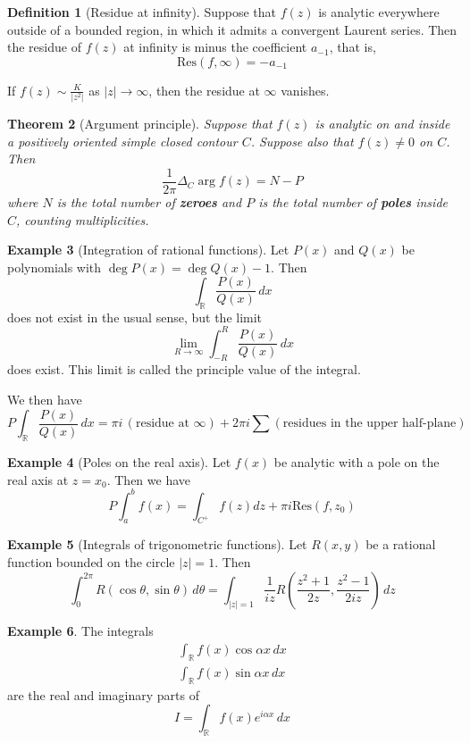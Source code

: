 \documentclass[10pt, oneside, reqno]{amsart}
\theoremstyle{plain}%
\newtheorem{thm}{Theorem}[section]
\theoremstyle{definition}
\newtheorem{defn}[thm]{Definition}
\newtheorem{exmp}[thm]{Example}
\theoremstyle{remark}
\newcommand{\res}[2]{\text{Res}(#1,#2)}
\newcommand{\R}{\mathbb{R}}
\begin{document}
\begin{defn}[Residue at infinity]
    Suppose that $f(z)$ is analytic everywhere outside of a bounded region, in which it admits a convergent Laurent series.  Then the residue of $f(z)$ at infinity is minus the coefficient $a_{-1}$, that is,\[
        \res{f}{\infty} = -a_{-1}
    \]
    
    If $f(z) \sim \frac{K}{|z^2|}$ as $|z| \rightarrow \infty$, then the residue at $\infty$ vanishes.
\end{defn}



\begin{thm}[Argument principle]
    Suppose that $f(z)$ is analytic on and inside a positively oriented simple closed contour $C$.  Suppose also that $f(z) \neq 0$ on $C$.  Then \[
        \frac{1}{2\pi} \Delta_C \arg f(z) = N - P
    \] where $N$ is the total number of \textbf{zeroes} and $P$ is the total number of \textbf{poles} inside $C$, counting multiplicities.
\end{thm}

\begin{exmp}[Integration of rational functions]
    Let $P(x)$ and $Q(x)$ be polynomials with $\deg P(x) = \deg Q(x) - 1$.  Then \[
        \int_\R \frac{P(x)}{Q(x)} \, dx 
    \] does not exist in the usual sense, but the limit \[
        \lim_{R \rightarrow \infty} \int_{-R}^R \frac{P(x)}{Q(x)} \, dx
    \] does exist.  This limit is called the principle value of the integral.

    We then have 
\[
    P \int_{\R} \frac{P(x)}{Q(x)} \, dx = \pi i \,(\text{residue at $\infty$}) + 2 \pi i \sum (\text{residues in the upper half-plane})
\]
\end{exmp}

\begin{exmp}[Poles on the real axis]
    Let $f(x)$ be analytic with a pole on the real axis at $z = x_0$.  Then we have \[
        P \int_a^b f(x) = \int_{C^+} f(z) dz + \pi i \res{f}{z_0}
    \]
\end{exmp}


\begin{exmp}[Integrals of trigonometric functions]
    Let $R(x,y)$ be a rational function bounded on the circle $|z| = 1$.  Then \[
        \int_0^{2 \pi} R(\cos \theta, \sin \theta) \, d \theta = \int_{|z| = 1} \frac{1}{iz} R\left( \frac{z^2 + 1}{2z}, \frac{z^2 - 1}{2 i z} \right) \, dz
    \] 
\end{exmp}

\begin{exmp}
    The integrals \begin{align*}
        \int_\R f(x) \cos \alpha x \, dx \\
        \int_\R f(x) \sin \alpha x \, dx
    \end{align*}
    are the real and imaginary parts of \[
        I = \int_\R f(x) e^{i \alpha x} \, dx
    \]
    
\end{exmp}
\end{document}
